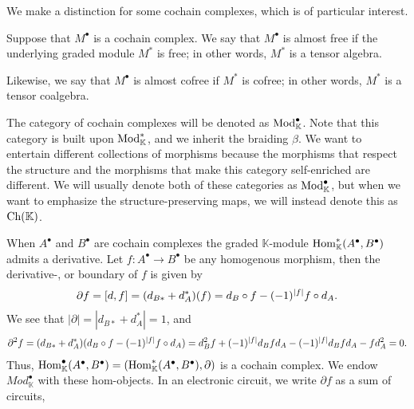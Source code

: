 \documentclass[../thesis.tex]{subfiles}
\begin{document}
            We make a distinction for some cochain complexes, which is of particular interest.
            
            \begin{definition}
                Suppose that $M^\bullet$ is a cochain complex. We say that $M^\bullet$ is almost free if the underlying graded module $M^*$ is free; in other words, $M^*$ is a tensor algebra.

                Likewise, we say that $M^\bullet$ is almost cofree if $M^*$ is cofree; in other words, $M^*$ is a tensor coalgebra.
            \end{definition}

            The category of cochain complexes will be denoted as $\tt{Mod}_\mathbb{K}^\bullet$. Note that this category is built upon $\tt{Mod}_\mathbb{K}^*$, and we inherit the braiding $\beta$. We want to entertain different collections of morphisms because the morphisms that respect the structure and the morphisms that make this category self-enriched are different. We will usually denote both of these categories as $\tt{Mod}_\mathbb{K}^\bullet$, but when we want to emphasize the structure-preserving maps, we will instead denote this as $\tt{Ch}(\mathbb{K})$.

            When $A^\bullet$ and $B^\bullet$ are cochain complexes the graded $\mathbb{K}$-module $\tt{Hom}_\mathbb{K}^*(A^\bullet, B^\bullet)$ admits a derivative. Let $f : A^\bullet \rightarrow B^\bullet$ be any homogenous morphism, then the derivative-, or boundary of $f$ is given by
            \begin{align*}
                \partial f = [d, f] = (d_{B*} + d_A^*)(f) = d_B \circ f - (-1)^{|f|}f\circ d_A\tt{.}
            \end{align*}
            We see that $|\partial| = |d_{B*} + d_A^*| = 1$, and
            \begin{align*}
                \partial^2f = (d_{B*} + d_A^*)(d_B \circ f - (-1)^{|f|}f\circ d_A) = d_B^2f + (-1)^{|f|}d_Bfd_A - (-1)^{|f|}d_Bfd_A - fd_A^2 = 0\tt{.}
            \end{align*}
            Thus, $\tt{Hom}_\mathbb{K}^\bullet(A^\bullet, B^\bullet) = (\tt{Hom}_\mathbb{K}^*(A^\bullet, B^\bullet), \partial)$ is a cochain complex. We endow $Mod_\mathbb{K}^\bullet$ with these hom-objects. In an electronic circuit, we write $\partial f$ as a sum of circuits,
            
\end{document}
